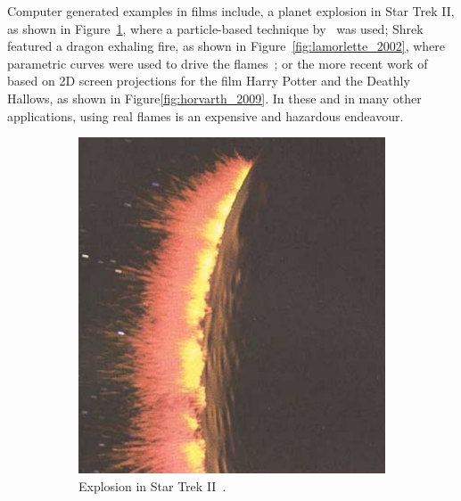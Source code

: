 Computer generated examples in films include, a planet explosion in Star Trek II, as shown in Figure~\ref{fig:reeves_1983}, where a particle-based technique by~\cite{Reeves:1983} was used; Shrek featured a dragon exhaling fire, as shown in Figure~\ref{fig:lamorlette_2002}, where parametric curves were used to drive the flames~\cite{Lamorlette:2002}; or the more recent work of~\cite{Horvath:2009} based on 2D screen projections for the film Harry Potter and the Deathly Hallows, as shown in Figure\ref{fig:horvarth_2009}.
In these and in many other applications, using real flames is an expensive and hazardous endeavour.

\begin{figure}[htpb!]
        \centering
        \begin{subfigure}[t]{0.3\textwidth}
                \includegraphics[width=\textwidth]{img/reeves_1983}
                \caption{Explosion in Star Trek II~\cite{Reeves:1983}.}
                \label{fig:reeves_1983}
        \end{subfigure}%
        \quad %
        \begin{subfigure}[t]{0.5\textwidth}

\end{subfigure}
\end{figure}
